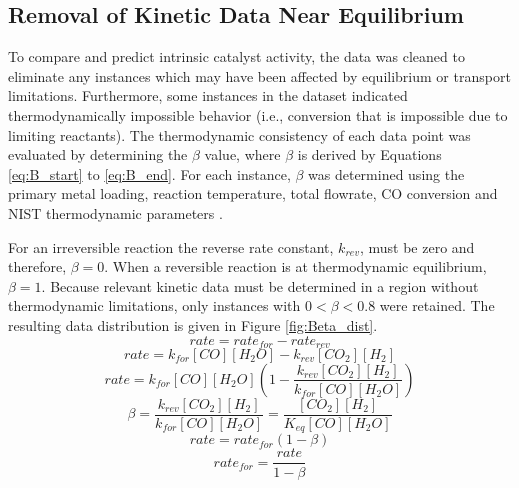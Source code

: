 	\subsection{Removal of Kinetic Data Near Equilibrium}
	To compare and predict intrinsic catalyst activity, the data was cleaned to eliminate any instances which may have been affected by equilibrium or transport limitations. Furthermore, some instances in the dataset indicated thermodynamically impossible behavior (i.e., conversion that is impossible due to limiting reactants). The thermodynamic consistency of each data point was evaluated by determining the $\beta$ value, where $\beta$ is derived by Equations \ref{eq:B_start} to \ref{eq:B_end}. For each instance, $\beta$ was determined using the primary metal loading, reaction temperature, total flowrate, CO conversion and NIST thermodynamic parameters \cite{NIST}. 

	For an irreversible reaction the reverse rate constant, $k_{rev}$, must be zero and therefore, $\beta = 0$. When a reversible reaction is at thermodynamic equilibrium, $\beta = 1$. Because relevant kinetic data must be determined in a region without thermodynamic limitations, only instances with  $0 < \beta < 0.8$ were retained. The resulting data distribution is given in Figure \ref{fig:Beta_dist}. 
	\begin{equation}
		rate = rate_{for} - rate_{rev} \label{eq:B_start}\end{equation}
	\begin{equation}
		rate = k_{for}[CO][H_2O] - k_{rev}[CO_2][H_2] \end{equation}
	\begin{equation}
		rate = k_{for}[CO][H_2O] \left(1 - \frac{k_{rev}[CO_2][H_2]}{k_{for}[CO][H_2O]}\right) \end{equation}
	\begin{equation}
		\beta = \frac{k_{rev}[CO_2][H_2]}{k_{for}[CO][H_2O]} = \frac{[CO_2][H_2]}{K_{eq}[CO][H_2O]} \end{equation}
	\begin{equation}
		rate = rate_{for}(1-\beta) \end{equation}
	\begin{equation}
		rate_{for} = \frac{rate}{1-\beta} \label{eq:B_end} \end{equation}

